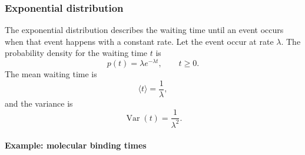 \subsubsection{Exponential distribution}

The exponential distribution describes the waiting time until an event occurs when that event happens with a constant rate.
Let the event occur at rate $\lambda$.
The probability density for the waiting time $t$ is
\[
    \boxed{p(t)=\lambda e^{-\lambda t}, \qquad t\geq0.}
\]
The mean waiting time is
\[
    \langle t\rangle = \frac{1}{\lambda},
\]
and the variance is
\[
    \operatorname{Var}(t)=\frac{1}{\lambda^2}.
\]

\paragraph{Example: molecular binding times}


